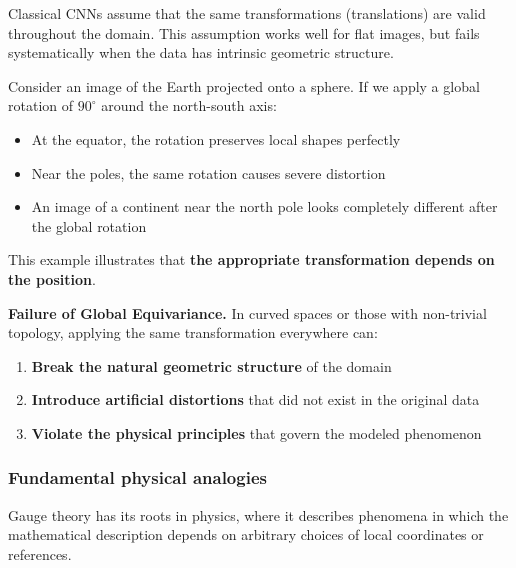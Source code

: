 Classical CNNs assume that the same transformations (translations) are valid throughout the domain. This assumption works well for flat images, but fails systematically when the data has intrinsic geometric structure.

\begin{example}
Consider an image of the Earth projected onto a sphere. If we apply a global rotation of $90^\circ$ around the north-south axis:
\begin{itemize}
    \item At the equator, the rotation preserves local shapes perfectly
    \item Near the poles, the same rotation causes severe distortion
    \item An image of a continent near the north pole looks completely different after the global rotation
\end{itemize}
This example illustrates that \textbf{the appropriate transformation depends on the position}.
\end{example}

\textbf{Failure of Global Equivariance.} In curved spaces or those with non-trivial topology, applying the same transformation everywhere can:
\begin{enumerate}
    \item \textbf{Break the natural geometric structure} of the domain
    \item \textbf{Introduce artificial distortions} that did not exist in the original data
    \item \textbf{Violate the physical principles} that govern the modeled phenomenon
\end{enumerate}

\subsubsection{Fundamental physical analogies}

Gauge theory has its roots in physics, where it describes phenomena in which the mathematical description depends on arbitrary choices of local coordinates or references.

